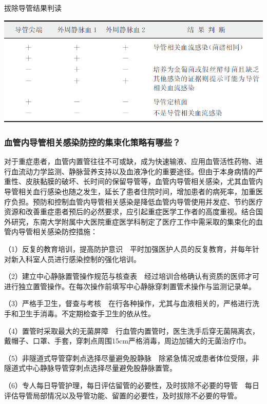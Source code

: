 \begin{table}[htbp]
\centering
\caption{拔除导管结果判读}
\label{tab25-3}
\includegraphics{./images/Image00298.jpg}
\end{table}

\subsubsection{血管内导管相关感染防控的集束化策略有哪些？}

对于重症患者，血管内置管往往不可或缺，成为快速输液、应用血管活性药物、进行血流动力学监测、静脉营养支持以及血液净化的重要途径。但由于本身病情的严重性、皮肤黏膜的破坏、长时间的保留导管等，血管内导管相关感染，尤其血管内导管相关血行感染也随之发生，延长了患者住院时间，增加患者的病死率，加重医疗负担。预防和控制血管内导管相关感染是降低血管内导管使用并发症、节约医疗资源和改善重症患者预后的必然要求，应引起重症医学工作者的高度重视。结合国外研究，东南大学附属中大医院重症医学科制定了医疗工作中需采取的集束化的血管内导管相关感染防控措施：

（1）反复的教育培训，提高防护意识　平时加强医护人员的反复教育，并每年针对新入科室人员进行感染控制的强化培训。

（2）建立中心静脉置管操作规范与核查表　经过培训合格确认有资质的医师才可进行独立置管操作。在每次操作前填写中心静脉穿刺置管术操作与监测记录单。

（3）严格手卫生，督查与考核　在行各种操作，尤其与血液相关的，严格进行洗手和卫生手消毒。不定期检查手卫生的依从性。

（4）置管时采取最大的无菌屏障　行血管内置管时，医生洗手后穿无菌隔离衣，戴帽子、口罩、手套，穿刺点周围15cm严格消毒，周边加铺大的无菌治疗巾。

（5）非隧道式导管穿刺点选择尽量避免股静脉　除紧急情况或患者体位受限，非隧道式中心静脉导管穿刺点选择尽量避免股静脉置管。

（6）专人每日导管护理，每日评估留管的必要性，及时拔除不必要的导管　每日评估导管局部情况以及导管功能、留置的必要性，及时拔除不必要的导管。

